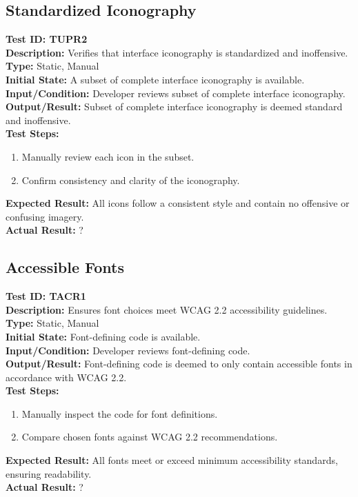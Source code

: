 \documentclass[12pt, titlepage]{article}
\begin{document}
\subsection{Standardized Iconography}
\textbf{Test ID: TUPR2}\\
\textbf{Description:} Verifies that interface iconography is standardized and inoffensive.\\
\textbf{Type:} Static, Manual\\
\textbf{Initial State:} A subset of complete interface iconography is available.\\
\textbf{Input/Condition:} Developer reviews subset of complete interface iconography.\\
\textbf{Output/Result:} Subset of complete interface iconography is deemed standard and inoffensive.\\
\textbf{Test Steps:}
\begin{enumerate}
    \item Manually review each icon in the subset.
    \item Confirm consistency and clarity of the iconography.
\end{enumerate}
\textbf{Expected Result:} All icons follow a consistent style and contain no offensive or confusing imagery.\\
\textbf{Actual Result:} ?

\subsection{Accessible Fonts}
\textbf{Test ID: TACR1}\\
\textbf{Description:} Ensures font choices meet WCAG 2.2 accessibility guidelines.\\
\textbf{Type:} Static, Manual\\
\textbf{Initial State:} Font-defining code is available.\\
\textbf{Input/Condition:} Developer reviews font-defining code.\\
\textbf{Output/Result:} Font-defining code is deemed to only contain accessible fonts in accordance with WCAG 2.2.\\
\textbf{Test Steps:}
\begin{enumerate}
    \item Manually inspect the code for font definitions.
    \item Compare chosen fonts against WCAG 2.2 recommendations.
\end{enumerate}
\textbf{Expected Result:} All fonts meet or exceed minimum accessibility standards, ensuring readability.\\
\textbf{Actual Result:} ?
\end{document}
